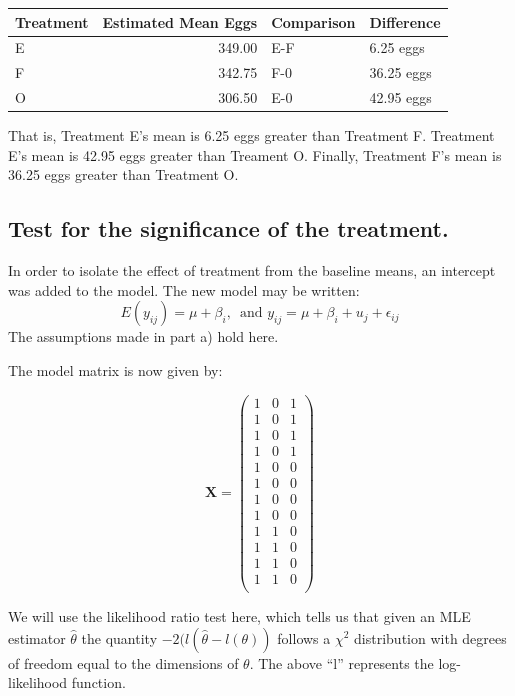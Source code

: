 \documentclass[11pt]{article}
\begin{document}
\begin{center}
\begin{tabular}{lrll}
 Treatment  &  Estimated Mean Eggs  &  Comparison  &  Difference  \\
\hline
 E          &               349.00  &  E-F         &  6.25 eggs   \\
 F          &               342.75  &  F-0         &  36.25 eggs  \\
 O          &               306.50  &  E-0         &  42.95 eggs  \\
\hline
\end{tabular}
\end{center}



That is, Treatment E's mean is 6.25 eggs greater than 
Treatment F. Treatment E's mean is 42.95 eggs greater than Treament
O. Finally, Treatment F's mean is 36.25 eggs greater than Treatment O.
\subsection{Test for the significance of the treatment.}
\label{sec-1-2}


In order to isolate the effect of treatment from the baseline means,
an intercept was added to the model. The new model may be written: 
$$E(y_{ij}) = \mu+ \beta_i,\,\text{ and }y_{ij} =\mu + \beta_i+u_{j}+\epsilon_{ij}$$
The assumptions made in part a) hold here.

The model matrix is now given by:



\[
\mathbf{X} = 
\begin{pmatrix}{}
  1 & 0 & 1 \\ 
  1 & 0 & 1 \\ 
  1 & 0 & 1 \\ 
  1 & 0 & 1 \\ 
  1 & 0 & 0 \\ 
  1 & 0 & 0 \\ 
  1 & 0 & 0 \\ 
  1 & 0 & 0 \\ 
  1 & 1 & 0 \\ 
  1 & 1 & 0 \\ 
  1 & 1 & 0 \\ 
  1 & 1 & 0 \\ 
  \end{pmatrix}
\]


We will use the likelihood ratio
test here, which tells us that given an MLE estimator $\hat{\theta}$
the quantity $-2(l(\hat{\theta} - l(\theta))$ follows a $\chi$$^2$
distribution with degrees of freedom equal to the dimensions of
$\theta$. The above ``l'' represents the log-likelihood function.
\end{document}
